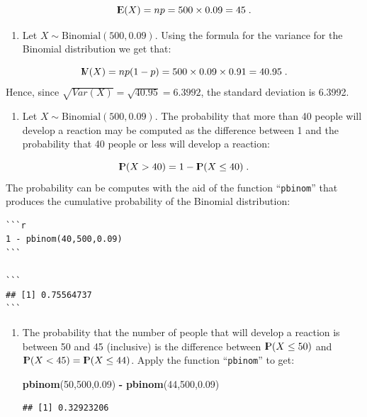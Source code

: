 \documentclass[]{krantz}
\makeatletter
\newenvironment{Shaded}{\begin{snugshade}}{\end{snugshade}}
\newcommand{\KeywordTok}[1]{\textcolor[rgb]{0.13,0.29,0.53}{\textbf{#1}}}
\newcommand{\DecValTok}[1]{\textcolor[rgb]{0.00,0.00,0.81}{#1}}
\newcommand{\FloatTok}[1]{\textcolor[rgb]{0.00,0.00,0.81}{#1}}
\newcommand{\StringTok}[1]{\textcolor[rgb]{0.31,0.60,0.02}{#1}}
\newcommand{\OperatorTok}[1]{\textcolor[rgb]{0.81,0.36,0.00}{\textbf{#1}}}
\newcommand{\NormalTok}[1]{#1}
\providecommand{\tightlist}{%
  \setlength{\itemsep}{0pt}\setlength{\parskip}{0pt}}
\newcommand{\Expec}{{\rm I\kern-.3em E}}
\newcommand{\Prob}{{\rm I\kern-.3em P}}
\newcommand{\Var}{{\rm I\kern-.3em V}}
\newenvironment{kframe}{%
\medskip{}
\setlength{\fboxsep}{.8em}
 \def\at@end@of@kframe{}%
 \ifinner\ifhmode%
  \def\at@end@of@kframe{\end{minipage}}%
  \begin{minipage}{\columnwidth}%
 \fi\fi%
 \def\FrameCommand##1{\hskip\@totalleftmargin \hskip-\fboxsep
 \colorbox{shadecolor}{##1}\hskip-\fboxsep
     \hskip-\linewidth \hskip-\@totalleftmargin \hskip\columnwidth}%
 \MakeFramed {\advance\hsize-\width
   \@totalleftmargin\z@ \linewidth\hsize
   \@setminipage}}%
 {\par\unskip\endMakeFramed%
 \at@end@of@kframe}
\renewenvironment{Shaded}{\begin{kframe}}{\end{kframe}}
\theoremstyle{definition}
\theoremstyle{definition}
\theoremstyle{definition}
\theoremstyle{remark}
\makeatother
\begin{document}
\[\Expec(X) = n p = 500 \times 0.09 = 45\;.\]

\begin{enumerate}
\def\labelenumi{\arabic{enumi}.}
\setcounter{enumi}{1}
\tightlist
\item
  Let \(X \sim \mbox{Binomial}(500,0.09)\). Using the formula for the
  variance for the Binomial distribution we get that:
\end{enumerate}

\[\Var(X) = n p(1-p) = 500 \times 0.09\times 0.91 = 40.95\;.\] Hence,
since \(\sqrt{Var(X)} = \sqrt{40.95} = 6.3992\), the standard deviation
is 6.3992.

\begin{enumerate}
\def\labelenumi{\arabic{enumi}.}
\setcounter{enumi}{2}
\tightlist
\item
  Let \(X \sim \mbox{Binomial}(500,0.09)\). The probability that more
  than 40 people will develop a reaction may be computed as the
  difference between 1 and the probability that 40 people or less will
  develop a reaction:
\end{enumerate}

\[\Prob(X > 40) = 1- \Prob(X \leq 40)\;.\] The probability can be
computes with the aid of the function ``\texttt{pbinom}'' that produces
the cumulative probability of the Binomial distribution:

\begin{verbatim}
```r
1 - pbinom(40,500,0.09)
```

```
## [1] 0.75564737
```
\end{verbatim}

\begin{enumerate}
\def\labelenumi{\arabic{enumi}.}
\setcounter{enumi}{3}
\item
  The probability that the number of people that will develop a reaction
  is between 50 and 45 (inclusive) is the difference between
  \(\Prob(X\leq 50)\) and \(\Prob(X < 45) = \Prob(X \leq 44)\). Apply
  the function ``\texttt{pbinom}'' to get:

\begin{Shaded}
\begin{Highlighting}[]
\KeywordTok{pbinom}\NormalTok{(}\DecValTok{50}\NormalTok{,}\DecValTok{500}\NormalTok{,}\FloatTok{0.09}\NormalTok{) }\OperatorTok{-}\StringTok{ }\KeywordTok{pbinom}\NormalTok{(}\DecValTok{44}\NormalTok{,}\DecValTok{500}\NormalTok{,}\FloatTok{0.09}\NormalTok{)}
\end{Highlighting}
\end{Shaded}

\begin{verbatim}
## [1] 0.32923206
\end{verbatim}
\end{enumerate}
\end{document}
